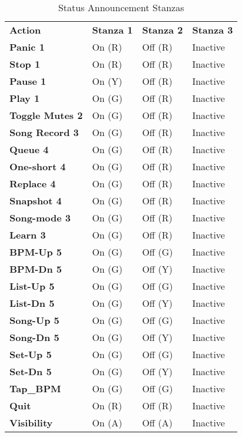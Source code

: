    \begin{table}[H]
      \centering
      \caption{Status Announcement Stanzas}
      \label{table:status_announcement Stanzas}
      \begin{tabular}{l l l l}
         \textbf{Action} & \textbf{Stanza 1} & \textbf{Stanza 2} & \textbf{Stanza 3} \\
         \textbf{Panic 1} & On (R) & Off (R) & Inactive \\
         \textbf{Stop 1} & On (R) & Off (R) & Inactive \\
         \textbf{Pause 1} & On (Y) & Off (R) & Inactive \\
         \textbf{Play 1} & On (G) & Off (R) & Inactive \\
         \textbf{Toggle Mutes 2} & On (G) & Off (R) & Inactive \\
         \textbf{Song Record 3} & On (G) & Off (R) & Inactive \\
         \textbf{Queue 4} & On (G) & Off (R) & Inactive \\
         \textbf{One-short 4} & On (G) & Off (R) & Inactive \\
         \textbf{Replace 4} & On (G) & Off (R) & Inactive \\
         \textbf{Snapshot 4} & On (G) & Off (R) & Inactive \\
         \textbf{Song-mode 3} & On (G) & Off (R) & Inactive \\
         \textbf{Learn 3} & On (G) & Off (R) & Inactive \\
         \textbf{BPM-Up 5} & On (G) & Off (G) & Inactive \\
         \textbf{BPM-Dn 5} & On (G) & Off (Y) & Inactive \\
         \textbf{List-Up 5} & On (G) & Off (G) & Inactive \\
         \textbf{List-Dn 5} & On (G) & Off (Y) & Inactive \\
         \textbf{Song-Up 5} & On (G) & Off (G) & Inactive \\
         \textbf{Song-Dn 5} & On (G) & Off (Y) & Inactive \\
         \textbf{Set-Up 5} & On (G) & Off (G) & Inactive \\
         \textbf{Set-Dn 5} & On (G) & Off (Y) & Inactive \\
         \textbf{Tap\_BPM} & On (G) & Off (G) & Inactive \\
         \textbf{Quit} & On (R) & Off (R) & Inactive \\
         \textbf{Visibility} & On (A) & Off (A) & Inactive \\
      \end{tabular}
   \end{table}

